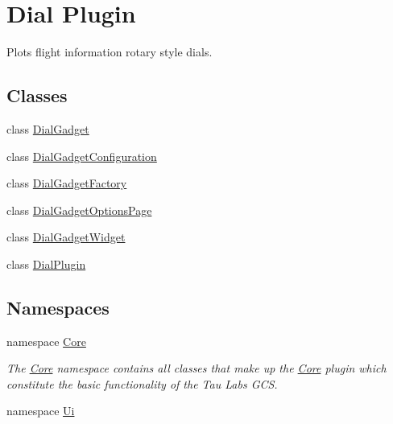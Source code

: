 \hypertarget{group___dial_plugin}{\section{\-Dial \-Plugin}
\label{group___dial_plugin}
}


\-Plots flight information rotary style dials.  


\subsection*{\-Classes}
\begin{DoxyCompactItemize}
\item 
class \hyperlink{class_dial_gadget}{\-Dial\-Gadget}
\item 
class \hyperlink{class_dial_gadget_configuration}{\-Dial\-Gadget\-Configuration}
\item 
class \hyperlink{class_dial_gadget_factory}{\-Dial\-Gadget\-Factory}
\item 
class \hyperlink{class_dial_gadget_options_page}{\-Dial\-Gadget\-Options\-Page}
\item 
class \hyperlink{class_dial_gadget_widget}{\-Dial\-Gadget\-Widget}
\item 
class \hyperlink{class_dial_plugin}{\-Dial\-Plugin}
\end{DoxyCompactItemize}
\subsection*{\-Namespaces}
\begin{DoxyCompactItemize}
\item 
namespace \hyperlink{namespace_core}{\-Core}
\begin{DoxyCompactList}\small\item\em \-The \hyperlink{namespace_core}{\-Core} namespace contains all classes that make up the \hyperlink{namespace_core}{\-Core} plugin which constitute the basic functionality of the \-Tau \-Labs \-G\-C\-S. \end{DoxyCompactList}\item 
namespace \hyperlink{namespace_ui}{\-Ui}
\end{DoxyCompactItemize}
